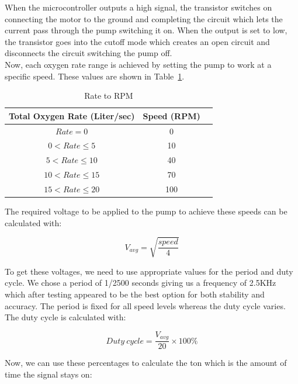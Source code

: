 \documentclass[a4paper, 12pt]{article}
\begin{document}
When the microcontroller outputs a high signal, the transistor switches on connecting the motor to the ground and completing the circuit which lets the current pass through the pump switching it on. When the output is set to low, the transistor goes into the cutoff mode which creates an open circuit and disconnects the circuit switching the pump off. \\

Now, each oxygen rate range is achieved by setting the pump to work at a specific speed. These values are shown in Table~\ref{tab:rate_rpm}.
\begin{table}[h]
\begin{center}
 \def\arraystretch{1.5}
 \begin{tabular}{|c|c|c|} 

 \hline
 Total Oxygen Rate (Liter/sec) & Speed (RPM) \\ [0.5ex] 
 \hline\hline
 $Rate = 0$ & 0 \\ 
 \hline
 $0 < Rate \leq 5$ & 10 \\ 
 \hline
  $5 < Rate \leq 10$ & 40 \\ 
 \hline
  $10 < Rate \leq 15$ & 70 \\ 
 \hline
  $15 < Rate \leq 20$ & 100 \\ [1ex] 
 \hline
\end{tabular}\caption{Rate to RPM} \label{tab:rate_rpm}
\end{center}
\end{table}

The required voltage to be applied to the pump to achieve these speeds can be calculated with:

\begin{equation*}
    V_{avg} = \sqrt{\frac{speed}{4}}
\end{equation*}

To get these voltages, we need to use appropriate values for the period and duty cycle. We chose a period of 1/2500 seconds giving us a frequency of 2.5KHz which after testing appeared to be the best option for both stability and accuracy. The period is fixed for all speed levels whereas the duty cycle varies. The duty cycle is calculated with: 

\begin{equation*}
    Duty \: cycle = \frac{V_{avg}}{20} \times 100\%
\end{equation*}

Now, we can use these percentages to calculate the ton which is the amount of time the signal stays on:
\end{document}
